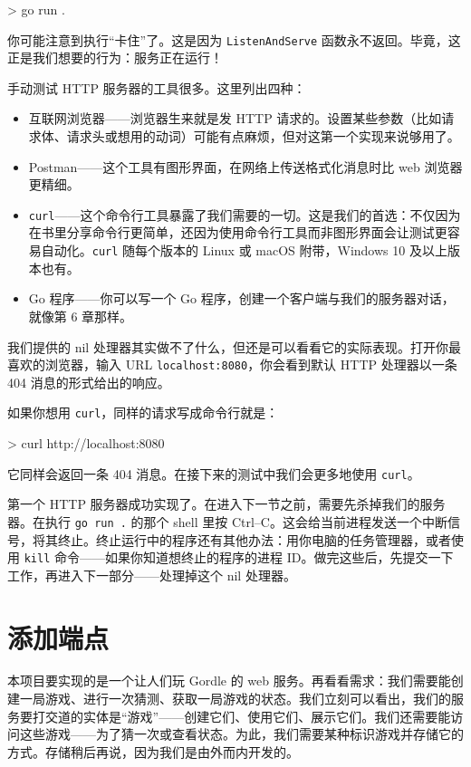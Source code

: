 \begin{shellcode}[]
> go run .
\end{shellcode}

你可能注意到执行``卡住''了。这是因为 \texttt{ListenAndServe} 函数永不返回。毕竟，这正是我们想要的行为：服务正在运行！

手动测试 HTTP 服务器的工具很多。这里列出四种：

\begin{itemize}
  \item 互联网浏览器——浏览器生来就是发 HTTP 请求的。设置某些参数（比如请求体、请求头或想用的动词）可能有点麻烦，但对这第一个实现来说够用了。
  \item Postman——这个工具有图形界面，在网络上传送格式化消息时比 web 浏览器更精细。
  \item \texttt{curl}——这个命令行工具暴露了我们需要的一切。这是我们的首选：不仅因为在书里分享命令行更简单，还因为使用命令行工具而非图形界面会让测试更容易自动化。\texttt{curl} 随每个版本的 Linux 或 macOS 附带，Windows 10 及以上版本也有。
  \item Go 程序——你可以写一个 Go 程序，创建一个客户端与我们的服务器对话，就像第 6 章那样。
\end{itemize}

我们提供的 nil 处理器其实做不了什么，但还是可以看看它的实际表现。打开你最喜欢的浏览器，输入 URL \texttt{localhost:8080}，你会看到默认 HTTP 处理器以一条 404 消息的形式给出的响应。

如果你想用 \texttt{curl}，同样的请求写成命令行就是：

\begin{shellcode}[]
> curl http://localhost:8080
\end{shellcode}

它同样会返回一条 404 消息。在接下来的测试中我们会更多地使用 \texttt{curl}。

第一个 HTTP 服务器成功实现了。在进入下一节之前，需要先杀掉我们的服务器。在执行 \texttt{go run .} 的那个 shell 里按 Ctrl–C。这会给当前进程发送一个中断信号，将其终止。终止运行中的程序还有其他办法：用你电脑的任务管理器，或者使用 \texttt{kill} 命令——如果你知道想终止的程序的进程 ID。做完这些后，先提交一下工作，再进入下一部分——处理掉这个 nil 处理器。

\section{添加端点}

本项目要实现的是一个让人们玩 Gordle 的 web 服务。再看看需求：我们需要能创建一局游戏、进行一次猜测、获取一局游戏的状态。我们立刻可以看出，我们的服务要打交道的实体是``游戏''——创建它们、使用它们、展示它们。我们还需要能访问这些游戏——为了猜一次或查看状态。为此，我们需要某种标识游戏并存储它的方式。存储稍后再说，因为我们是由外而内开发的。

